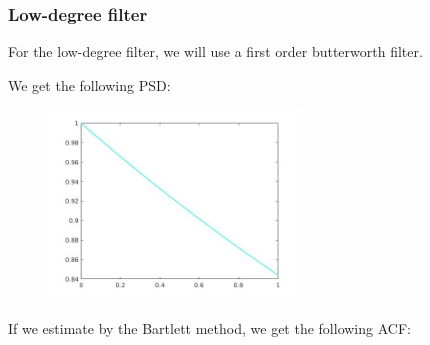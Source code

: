 \documentclass[a4paper,11pt]{article}
\begin{document}
\subsubsection{Low-degree filter}

For the low-degree filter, we will use a first order butterworth filter.

We get the following PSD:

\begin{figure}[!hp]
    \begin{center}
      \includegraphics[width=0.6\textwidth]{images/lab1_42.jpg}
    \end{center}
\end{figure}

\newpage

If we estimate by the Bartlett method, we get the following ACF:
\end{document}
